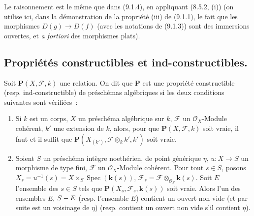 Le raisonnement est le même que dans (9.1.4), en appliquant (8.5.2, (i))
(on utilise ici, dans la démonstration de la propriété (iii) de (9.1.1), le
fait que les morphismes $D(g)\to D(f)$ (avec les notations de (9.1.3)) sont
des immersions ouvertes, et \emph{a fortiori} des morphismes plats).

\subsection{Propriétés constructibles et ind-constructibles.}
\label{subsection:IV.9.2-fr}

\begin{definition}[9.2.1]
\label{IV.9.2.1-fr}
Soit $\boldsymbol{P}(X,\mathcal F,k)$ une relation. On dit que $\boldsymbol{P}$ est une
propriété constructible (\textup{resp.} ind-constructible) de préschémas
algébriques si les deux conditions suivantes sont vérifiées~:
\begin{enumerate}[label=\textup{(\roman*)}]
  \item Si $k$ est un corps, $X$ un préschéma algébrique sur $k$,
  $\mathcal F$ un $\mathcal O_X$-Module cohérent, $k'$ une extension de $k$,
  alors, pour que $\boldsymbol{P}(X,\mathcal F,k)$ soit vraie, il faut et il suffit
  que $\boldsymbol{P}(X_{(k')},\mathcal F\otimes_k k',k')$ soit vraie.
  \item Soient $S$ un préschéma intègre noethérien, de point générique $\eta$,
  $u:X\to S$ un morphisme de type fini, $\mathcal F$ un $\mathcal O_X$-Module
  cohérent. Pour tout $s\in S$, posons
  $X_s=u^{-1}(s)=X\times_S\operatorname{Spec}(\boldsymbol{k}(s))$,
  $\mathcal F_s=\mathcal F\otimes_{\mathcal O_S}\boldsymbol{k}(s)$. Soit $E$ l'ensemble
  des $s\in S$ tels que $\boldsymbol{P}(X_s,\mathcal F_s,\boldsymbol{k}(s))$ soit vraie.
  Alors l'un des ensembles $E$, $S- E$ (\textup{resp.} l'ensemble $E$) contient un
  ouvert non vide \textup{(et par suite est un voisinage de $\eta$)} (\textup{resp.} contient
  un ouvert non vide s'il contient $\eta$).
\end{enumerate}
\end{definition}

